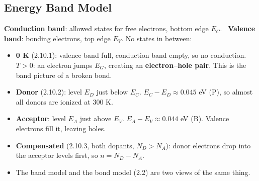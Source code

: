     \subsection[2.10]{Energy Band Model}
    \textbf{Conduction band}: allowed states for free electrons, bottom edge $E_C$. \ \textbf{Valence band}: bonding electrons, top edge $E_V$. No states in between: 
    \\[2pt]
    {\centering
    \newcommand{\bandbase}{%
        \fill[gray!20] (0,1.15) rectangle (1.3,1.5);
        \fill[gray!20] (0,0) rectangle (1.3,0.35);
        \draw[thick] (0,1.15) -- (1.3,1.15); \draw[thick] (0,0.35) -- (1.3,0.35);
        \node[left, inner sep=1pt] at (0,1.15) {\tiny$E_C$};
        \node[left, inner sep=1pt] at (0,0.35) {\tiny$E_V$};}
    \par}
    \begin{itemize}
        \item \textbf{0 K} (2.10.1): valence band full, conduction band empty, so no conduction. \textbf{$T > 0$}: an electron jumps $E_G$, creating an \textbf{electron--hole pair}. This is the band picture of a broken bond. 
        \item \textbf{Donor} (2.10.2): level $E_D$ just below $E_C$. $E_C - E_D \approx 0.045$ eV (P), so almost all donors are ionized at 300 K.
        \item \textbf{Acceptor}: level $E_A$ just above $E_V$. $E_A - E_V \approx 0.044$ eV (B). Valence electrons fill it, leaving holes.
        \item \textbf{Compensated} (2.10.3, both dopants, $N_D > N_A$): donor electrons drop into the acceptor levels first, so $n = N_D - N_A$.
        \item The band model and the bond model (2.2) are two views of the same thing.
    \end{itemize}

